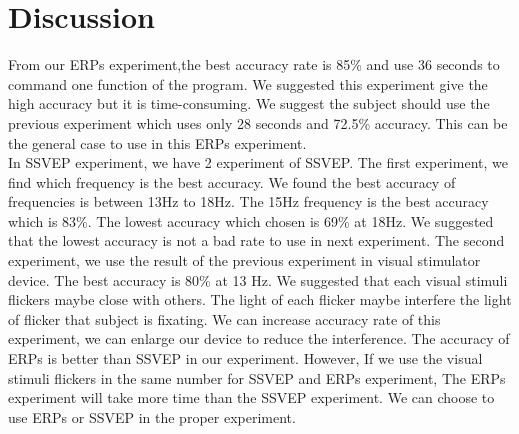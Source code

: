 \section{Discussion}
\hspace{1.5cm} From our ERPs experiment,the best accuracy rate is 85\% and use 36 seconds to command one function of the program. We suggested this experiment give the high accuracy but it is time-consuming. We suggest the subject should use the previous experiment which uses only 28 seconds and 72.5\% accuracy. This can be the general case to use in this ERPs experiment.\\
\hspace{1.5cm} \hspace{1.5cm}In SSVEP experiment, we have 2 experiment of SSVEP. The first experiment, we find which frequency is the best accuracy. We found the best accuracy of frequencies is between 13Hz to  18Hz. The 15Hz frequency is the best accuracy which is 83\%. The lowest accuracy which chosen is 69\% at 18Hz. We suggested that the lowest accuracy is not a bad rate  to use in next experiment. The second experiment, we use the result of the previous experiment in visual stimulator device. The best accuracy is 80\% at 13 Hz. We suggested that each visual stimuli flickers maybe close with others. The light of each flicker maybe interfere the light of flicker that subject is fixating. We can increase accuracy rate of this experiment, we can enlarge our device to reduce the interference. The accuracy of ERPs is better than SSVEP in our experiment. However, If we use the visual stimuli flickers in the same number for SSVEP and ERPs experiment, The ERPs experiment will take more time than the SSVEP experiment. We can choose to use ERPs or SSVEP in the proper experiment.

